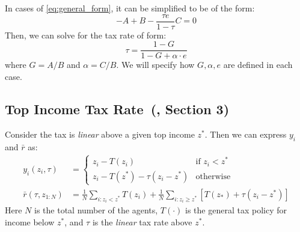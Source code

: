 In cases of \eqref{eq:general_form}, it can be simplified to be of the form:
\begin{equation*}
    - A + B - \frac{\tau e}{1-\tau} C = 0
\end{equation*}
Then, we can solve for the tax rate of form:
\begin{equation*}
    \tau = \frac{1-G}{1-G+\alpha\cdot e}
\end{equation*}
where $G = A/B$ and $\alpha = C/B$. We will specify how $G, \alpha, e$ are defined in each case.

\subsection{Top Income Tax Rate~(\citet{saez2001using}, Section 3)}
Consider the tax is \textit{linear} above a given top income $z^*$. Then we can express $y_i$ and $\bar{r}$ as:
\begin{align*}
    y_i(z_i, \tau) &= \begin{cases}
      z_i - T(z_i) & \text{if $z_i < z^*$}\\
      z_i - T(z^*) - \tau(z_i-z^*) & \text{otherwise}
    \end{cases} \\
    \bar{r}(\tau, z_{1:N}) &= \frac{1}{N}\sum_{i:z_i<z^*}T(z_i) + \frac{1}{N}\sum_{i:z_i\geq z^*}\left [T(z_*) + \tau(z_i-z^*)\right ]
\end{align*}
Here $N$ is the total number of the agents, $T(\cdot)$ is the general tax policy for income below $z^*$, and $\tau$ is the \textit{linear} tax rate above $z^*$.

